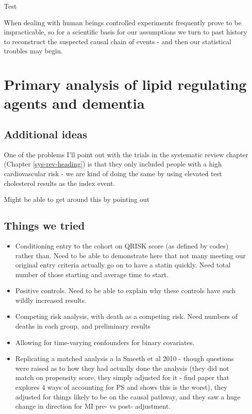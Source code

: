 \documentclass[a4paper, twoside]{templates/ociamthesis}
\providecommand{\tightlist}{%
  \setlength{\itemsep}{0pt}\setlength{\parskip}{0pt}}
\begin{document}
Test

\begin{savequote}
When dealing with human beings controlled experiments frequently prove
to be impracticable, so for a scientific basis for our assumptions we
turn to past history to reconstruct the suspected causal chain of events
- and then our statistical troubles may begin.
\end{savequote}



\hypertarget{cprd-analysis-heading}{%
\chapter{Primary analysis of lipid regulating agents and dementia}\label{cprd-analysis-heading}}

\minitoc 

\hypertarget{additional-ideas-2}{%
\section{Additional ideas}\label{additional-ideas-2}}

One of the problems I'll point out with the trials in the systematic review chapter (Chapter \ref{sys-rev-heading}) is that they only included people with a high cardiovascular risk - we are kind of doing the same by using elevated test cholesterol results as the index event.

Might be able to get around this by pointing out

\hypertarget{things-we-tried}{%
\section{Things we tried}\label{things-we-tried}}

\begin{itemize}
\tightlist
\item
  Conditioning entry to the cohort on QRISK score (as defined by codes) rather than. Need to be able to demonstrate here that not many meeting our original entry criteria actually go on to have a statin quickly. Need total number of those starting and average time to start.
\item
  Positive controls. Need to be able to explain why these controls have such wildly increased results.
\item
  Competing risk analysis, with death as a competing risk. Need numbers of deaths in each group, and preliminary results
\item
  Allowing for time-varying confounders for binary covariates.
\item
  Replicating a matched analysis a la Smeeth et al 2010 - though questions were raised as to how they had actually done the analysis (they did not match on propensity score, they simply adjusted for it - find paper that explores 4 ways of accounting for PS and shows this is the worst), they adjusted for things likely to be on the causal pathway, and they saw a huge change in direction for MI pre- vs post- adjustment.
\end{itemize}
\end{document}

